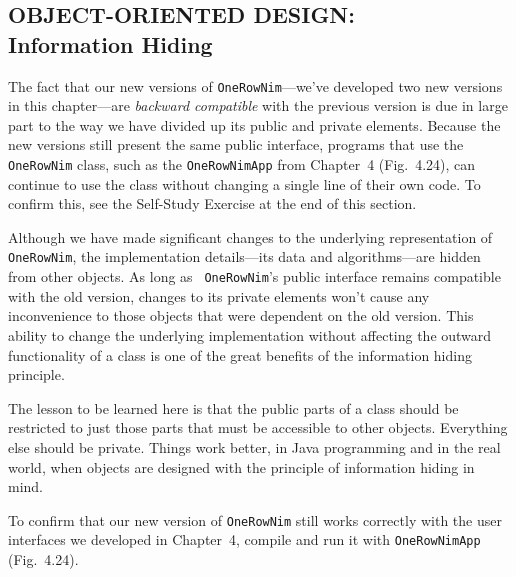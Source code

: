 \subsection{OBJECT-ORIENTED DESIGN: \\ Information Hiding}
\label{mbox-design-information-hiding}

\noindent The fact that our new versions of {\tt OneRowNim}---we've developed
two new versions in this chapter---are {\it backward compatible} with
the previous version is due in large part to
the way we have divided up its public and private elements.  Because
the new versions still present the same public interface, programs
that use the {\tt OneRowNim} class, such as the {\tt OneRowNimApp}
from Chapter~4 (Fig.~4.24), can continue to use the class without
changing a single line of their own code. To confirm this, see the
Self-Study Exercise at the end of this section.

Although we have made significant changes to the underlying
representation of {\tt OneRowNim}, the implementation details---its
data and algorithms---are hidden from other objects.  As long as {\tt
OneRowNim}'s public interface remains compatible with the old version,
changes to its private elements won't cause any inconvenience to those
objects that were dependent on the old version.  This ability to
change the underlying implementation without affecting the outward
functionality of a class is one of the great benefits of the
information hiding principle.


The lesson to be learned here is that the public parts of a class
should be restricted to just those parts that must be accessible to
other objects.  Everything else should be private.  Things work better,
in Java programming and in the real world, when objects are designed
with the principle of information hiding in mind.

\label{self-study-exercise}
\begin{SSTUDY}
\item  To confirm that our new version of {\tt OneRowNim} still works
correctly with the user interfaces we developed in Chapter~4, compile
and run it with {\tt OneRowNimApp} (Fig.~4.24).

\end{SSTUDY}

